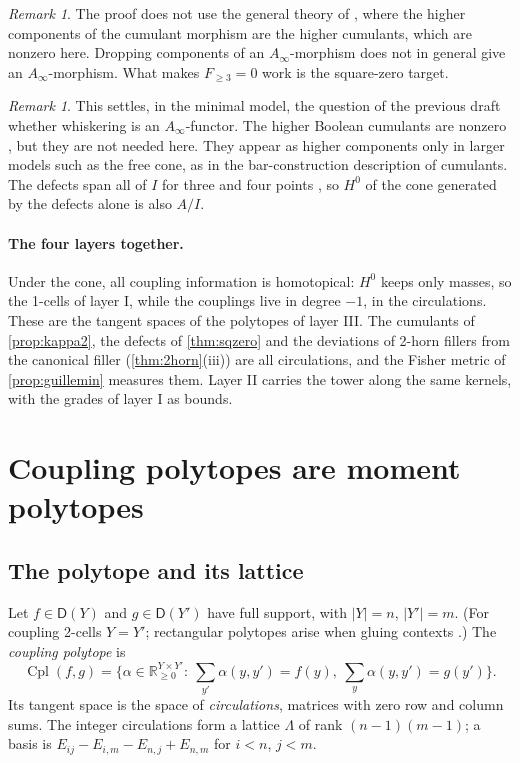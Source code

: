 \documentclass[11pt]{article}
\theoremstyle{definition}
\theoremstyle{remark}
\newtheorem{remark}[theorem]{Remark}
\newcommand{\D}{\mathsf{D}}
\newcommand{\Cpl}{\operatorname{Cpl}}
\begin{document}
\begin{remark}
The proof does not use the general theory of \cite{HPT1,HPT2}, where the higher components of the cumulant
morphism are the higher cumulants, which are nonzero here. Dropping components of an $A_\infty$-morphism does not in general
give an $A_\infty$-morphism. What makes $F_{\ge3}=0$ work is the square-zero target.
\end{remark}

\begin{remark}
This settles, in the minimal model, the question of the previous draft whether whiskering is an $A_\infty$-functor.
The higher Boolean cumulants are nonzero \cite[\S9]{Awasthi-Family}, but they are not needed here. They appear as
higher components only in larger models such as the free cone, as in the bar-construction description of
cumulants. The defects span all of $I$ for three and four points \cite[\S10]{Awasthi-Family}, so $H^0$ of the cone
generated by the defects alone is also $A/I$.
\end{remark}

\paragraph{The four layers together.} Under the cone, all coupling information is homotopical: $H^0$ keeps only
masses, so the 1-cells of layer I, while the couplings live in degree $-1$, in the circulations. These are the
tangent spaces of the polytopes of layer III. The cumulants of \cref{prop:kappa2}, the defects of \cref{thm:sqzero}
and the deviations of 2-horn fillers from the canonical filler (\cref{thm:2horn}(iii)) are all circulations, and
the Fisher metric of \cref{prop:guillemin} measures them. Layer II carries the tower along the same kernels, with
the grades of layer I as bounds.

\section{Coupling polytopes are moment polytopes}\label{sec:toric}

\subsection{The polytope and its lattice}

Let $f\in\D(Y)$ and $g\in\D(Y')$ have full support, with $\lvert Y\rvert=n$, $\lvert Y'\rvert=m$. (For
coupling 2-cells $Y=Y'$; rectangular polytopes arise when gluing contexts
\cite[Prop.~7.11]{Awasthi-Attribution}.) The \emph{coupling polytope} is
\[
\Cpl(f,g)=\Big\{\alpha\in\mathbb{R}_{\ge0}^{Y\times Y'}:\ \textstyle\sum_{y'}\alpha(y,y')=f(y),\
\sum_y\alpha(y,y')=g(y')\Big\}.
\]
Its tangent space is the space of \emph{circulations}, matrices with zero row and column sums. The
integer circulations form a lattice $\Lambda$ of rank $(n-1)(m-1)$; a basis is
$E_{ij}-E_{i,m}-E_{n,j}+E_{n,m}$ for $i<n$, $j<m$.
\end{document}

